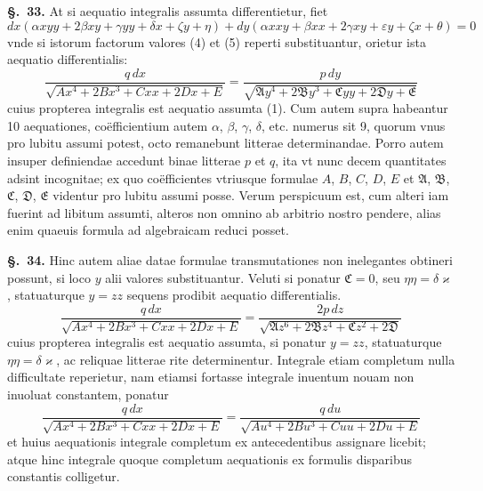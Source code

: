 \documentclass{article}
\begin{document}
\textbf{§.~33.} At si aequatio integralis assumta differentietur, fiet
\[ dx(\alpha xyy + 2\beta xy + \gamma yy + \delta x + \zeta y + \eta)
   + dy(\alpha xxy + \beta xx + 2\gamma xy + \varepsilon y + \zeta x + \theta) = 0 \tag{6} \]
vnde si istorum factorum valores (4) et (5) reperti substituantur, orietur ista aequatio
differentialis:
\[ \frac{q\,dx}{\sqrt{Ax^{4} + 2Bx^{3} + Cxx + 2Dx + E}}
   = \frac{p\,dy}{\sqrt{\mathfrak{A}y^{4} + 2\mathfrak{B}y^{3} + \mathfrak{C}yy + 2\mathfrak{D}y + \mathfrak{E}}} \tag{7} \]
cuius propterea integralis est aequatio assumta (1). Cum autem supra habeantur 10 aequationes,
coëfficientium autem $\alpha$, $\beta$, $\gamma$, $\delta$, etc. numerus sit 9, quorum vnus pro
lubitu assumi potest, octo remanebunt litterae determinandae. Porro autem insuper definiendae
accedunt binae litterae $p$ et $q$, ita vt nunc decem quantitates adsint incognitae; ex quo
coëfficientes vtriusque formulae $A$, $B$, $C$, $D$, $E$ et $\mathfrak{A}$, $\mathfrak{B}$,
$\mathfrak{C}$, $\mathfrak{D}$, $\mathfrak{E}$ videntur pro lubitu assumi posse. Verum perspicuum
est, cum alteri iam fuerint ad libitum assumti, alteros non omnino ab arbitrio nostro pendere,
alias enim quaeuis formula ad algebraicam reduci posset.

\textbf{§.~34.} Hinc autem aliae datae formulae transmutationes non inelegantes obtineri
possunt, si loco $y$ alii valores substituantur. Veluti si ponatur $\mathfrak{C} = 0$, seu
$\eta\eta = \delta\varkappa$, statuaturque $y = zz$ sequens prodibit aequatio differentialis.
\[ \frac{q\,dx}{\sqrt{Ax^{4} + 2Bx^{3} + Cxx + 2Dx + E}}
   = \frac{2p\,dz}{\sqrt{\mathfrak{A}z^{6} + 2\mathfrak{B}z^{4} + \mathfrak{C}z^{2} + 2\mathfrak{D}}} \tag{8} \]
cuius propterea integralis est aequatio assumta, si ponatur $y = zz$, statuaturque
$\eta\eta = \delta\varkappa$, ac reliquae litterae rite
determinentur. Integrale etiam completum nulla difficultate reperietur, nam etiamsi fortasse
integrale inuentum nouam non inuoluat constantem, ponatur
\[ \frac{q\,dx}{\sqrt{Ax^{4} + 2Bx^{3} + Cxx + 2Dx + E}} = \frac{q\,du}{\sqrt{Au^{4} + 2Bu^{3} + Cuu + 2Du + E}} \]
et huius aequationis integrale completum ex antecedentibus assignare licebit; atque hinc integrale
quoque completum aequationis ex formulis disparibus constantis colligetur.
\end{document}
